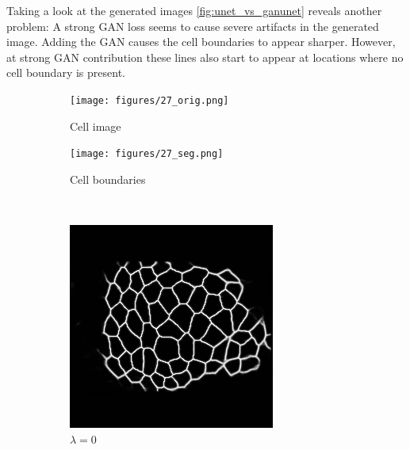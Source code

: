 \documentclass[aps,prl,twocolumn,groupedaddress,amsmath,amssymb]{revtex4-1}
\begin{document}
    Taking a look at the generated images \autoref{fig:unet_vs_ganunet}
    reveals another problem: A strong GAN loss seems to cause severe artifacts
    in the generated image. Adding the GAN causes the cell boundaries to
    appear sharper. However, at strong GAN contribution these lines also start
    to appear at locations where no cell boundary is present.

    \begin{figure}[tbp]
        \begin{subfigure}[c]{0.45\linewidth}
            \texttt{[image: figures/27\_orig.png]}
            \caption{Cell image}
        \end{subfigure} %
        \begin{subfigure}[c]{0.45\linewidth}
            \texttt{[image: figures/27\_seg.png]}
            \caption{Cell boundaries}
        \end{subfigure} \\
        \begin{subfigure}[c]{0.45\linewidth}
            \includegraphics[width=\linewidth]{figures/27-00.png}
            \caption{$\lambda=0$}
        \end{subfigure}%
        \begin{subfigure}[c]{0.45\linewidth}

\end{subfigure}
\end{figure}
\end{document}
